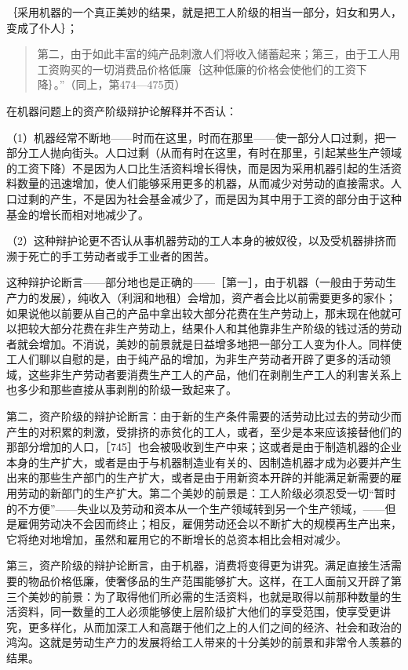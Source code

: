 ｛采用机器的一个真正美妙的结果，就是把工人阶级的相当一部分，妇女和男人，变成了仆人｝；

\begin{quote}{第二，由于如此丰富的纯产品刺激人们将收入储蓄起来；第三，由于工人用工资购买的一切消费品价格低廉｛这种低廉的价格会使他们的工资下降｝。”（同上，第474—475页）}\end{quote}

在机器问题上的资产阶级辩护论解释并不否认：

（1）机器经常不断地——时而在这里，时而在那里——使一部分人口过剩，把一部分工人抛向街头。人口过剩（从而有时在这里，有时在那里，引起某些生产领域的工资下降）不是因为人口比生活资料增长得快，而是因为采用机器引起的生活资料数量的迅速增加，使人们能够采用更多的机器，从而减少对劳动的直接需求。人口过剩的产生，不是因为社会基金减少了，而是因为其中用于工资的部分由于这种基金的增长而相对地减少了。

（2）这种辩护论更不否认从事机器劳动的工人本身的被奴役，以及受机器排挤而濒于死亡的手工劳动者或手工业者的困苦。

这种辩护论断言——部分地也是正确的——［第一］，由于机器（一般由于劳动生产力的发展），纯收入（利润和地租）会增加，资产者会比以前需要更多的家仆；如果说他以前要从自己的产品中拿出较大部分花费在生产劳动上，那末现在他就可以把较大部分花费在非生产劳动上，结果仆人和其他靠非生产阶级的钱过活的劳动者就会增加。不消说，美妙的前景就是日益增多地把一部分工人变为仆人。同样使工人们聊以自慰的是，由于纯产品的增加，为非生产劳动者开辟了更多的活动领域，这些非生产劳动者要消费生产工人的产品，他们在剥削生产工人的利害关系上也多少和那些直接从事剥削的阶级一致起来了。

第二，资产阶级的辩护论断言：由于新的生产条件需要的活劳动比过去的劳动少而产生的对积累的刺激，受排挤的赤贫化的工人，或者，至少是本来应该接替他们的那部分增加的人口，［745］也会被吸收到生产中来；这或者是由于制造机器的企业本身的生产扩大，或者是由于与机器制造业有关的、因制造机器才成为必要并产生出来的那些生产部门的生产扩大，或者是由于用新资本开辟的并能满足新需要的雇用劳动的新部门的生产扩大。第二个美妙的前景是：工人阶级必须忍受一切“暂时的不方便”——失业以及劳动和资本从一个生产领域转到另一个生产领域，——但是雇佣劳动决不会因而终止；相反，雇佣劳动还会以不断扩大的规模再生产出来，它将绝对地增加，虽然和雇用它的不断增长的总资本相比会相对减少。

第三，资产阶级的辩护论断言，由于机器，消费将变得更为讲究。满足直接生活需要的物品价格低廉，使奢侈品的生产范围能够扩大。这样，在工人面前又开辟了第三个美妙的前景：为了取得他们所必需的生活资料，也就是取得以前那种数量的生活资料，同一数量的工人必须能够使上层阶级扩大他们的享受范围，使享受更讲究，更多样化，从而加深工人和高踞于他们之上的人们之间的经济、社会和政治的鸿沟。这就是劳动生产力的发展将给工人带来的十分美妙的前景和非常令人羡慕的结果。

